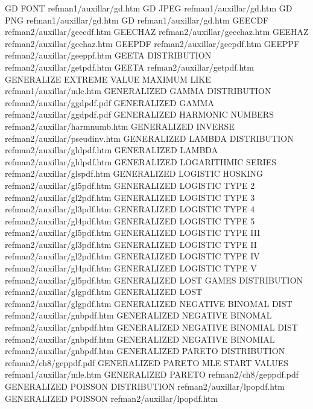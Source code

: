 GD FONT                                 refman1/auxillar/gd.htm
GD JPEG                                 refman1/auxillar/gd.htm
GD PNG                                  refman1/auxillar/gd.htm
GD                                      refman1/auxillar/gd.htm
GEECDF                                  refman2/auxillar/geecdf.htm
GEECHAZ                                 refman2/auxillar/geechaz.htm
GEEHAZ                                  refman2/auxillar/geehaz.htm
GEEPDF                                  refman2/auxillar/geepdf.htm
GEEPPF                                  refman2/auxillar/geeppf.htm
GEETA DISTRIBUTION                      refman2/auxillar/getpdf.htm
GEETA                                   refman2/auxillar/getpdf.htm
GENERALIZE EXTREME VALUE MAXIMUM LIKE   refman1/auxillar/mle.htm
GENERALIZED GAMMA DISTRIBUTION          refman2/auxillar/ggdpdf.pdf
GENERALIZED GAMMA                       refman2/auxillar/ggdpdf.pdf
GENERALIZED HARMONIC NUMBERS            refman2/auxillar/harmnumb.htm
GENERALIZED INVERSE                     refman2/auxillar/pseudinv.htm
GENERALIZED LAMBDA DISTRIBUTION         refman2/auxillar/gldpdf.htm
GENERALIZED LAMBDA                      refman2/auxillar/gldpdf.htm
GENERALIZED LOGARITHMIC SERIES          refman2/auxillar/glspdf.htm
GENERALIZED LOGISTIC HOSKING            refman2/auxillar/gl5pdf.htm
GENERALIZED LOGISTIC TYPE 2             refman2/auxillar/gl2pdf.htm
GENERALIZED LOGISTIC TYPE 3             refman2/auxillar/gl3pdf.htm
GENERALIZED LOGISTIC TYPE 4             refman2/auxillar/gl4pdf.htm
GENERALIZED LOGISTIC TYPE 5             refman2/auxillar/gl5pdf.htm
GENERALIZED LOGISTIC TYPE III           refman2/auxillar/gl3pdf.htm
GENERALIZED LOGISTIC TYPE II            refman2/auxillar/gl2pdf.htm
GENERALIZED LOGISTIC TYPE IV            refman2/auxillar/gl4pdf.htm
GENERALIZED LOGISTIC TYPE V             refman2/auxillar/gl5pdf.htm
GENERALIZED LOST GAMES DISTRIBUTION     refman2/auxillar/glgpdf.htm
GENERALIZED LOST                        refman2/auxillar/glgpdf.htm
GENERALIZED NEGATIVE BINOMAL DIST       refman2/auxillar/gnbpdf.htm
GENERALIZED NEGATIVE BINOMAL            refman2/auxillar/gnbpdf.htm
GENERALIZED NEGATIVE BINOMIAL DIST      refman2/auxillar/gnbpdf.htm
GENERALIZED NEGATIVE BINOMIAL           refman2/auxillar/gnbpdf.htm
GENERALIZED PARETO DISTRIBUTION         refman2/ch8/geppdf.pdf
GENERALIZED PARETO MLE START VALUES     refman1/auxillar/mle.htm
GENERALIZED PARETO                      refman2/ch8/geppdf.pdf
GENERALIZED POISSON DISTRIBUTION        refman2/auxillar/lpopdf.htm
GENERALIZED POISSON                     refman2/auxillar/lpopdf.htm
